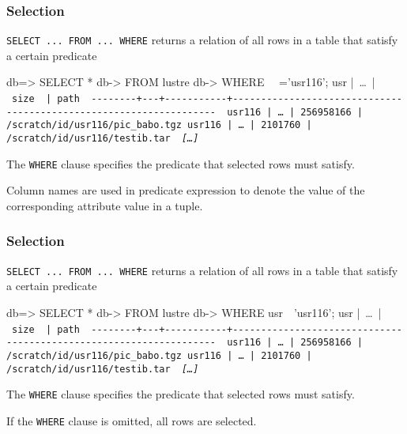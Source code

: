 \documentclass[english,serif,mathserif]{beamer}
\begin{document}
\begin{frame}[fragile]
  \frametitle{Selection}

  \texttt{SELECT ... FROM ... WHERE} returns a relation of all rows in a table
  that satisfy a certain predicate

  \+
\begin{sql}[basicstyle=\ttfamily\tiny]
db=> SELECT *
db-> FROM lustre
db-> WHERE ~~='usr116';
  usr   |~\ldots~|   ~\tt size~    | path
~-{}-{}-{}-{}-{}-{}-{}-{}+{}-{}-{}-{}+{}-{}-{}-{}-{}-{}-{}-{}-{}-{}-{}-{}+{}-{}-{}-{}-{}-{}-{}-{}-{}-{}-{}-{}-{}-{}-{}-{}-{}-{}-{}-{}-{}-{}-{}-{}-{}-{}-{}-{}-{}-{}-{}-{}-{}-{}-{}-{}-{}-{}-{}-{}-{}-{}-{}-{}-{}-{}-{}-{}-{}-{}-{}-{}-{}-{}-{}-{}-{}-{}-{}-{}-{}-{}-{}-{}-{}-{}-{}-{}~
 usr116 |~\ldots~| 256958166 | /scratch/id/usr116/pic_babo.tgz
 usr116 |~\ldots~|   2101760 | /scratch/id/usr116/testib.tar
 ~{\em [\ldots]}~
\end{sql}

The \texttt{WHERE} clause specifies the predicate that selected rows must
satisfy.

\+ Column names are used in predicate expression to denote the value of the
corresponding attribute value in a tuple.
\end{frame}


\begin{frame}[fragile]
  \frametitle{Selection}

  \texttt{SELECT ... FROM ... WHERE} returns a relation of all rows in a table
  that satisfy a certain predicate

  \+
\begin{sql}[basicstyle=\ttfamily\tiny]
db=> SELECT *
db-> FROM lustre
db-> WHERE usr~\HL{=}~'usr116';
  usr   |~\ldots~|   ~\tt size~    | path
~-{}-{}-{}-{}-{}-{}-{}-{}+{}-{}-{}-{}+{}-{}-{}-{}-{}-{}-{}-{}-{}-{}-{}-{}+{}-{}-{}-{}-{}-{}-{}-{}-{}-{}-{}-{}-{}-{}-{}-{}-{}-{}-{}-{}-{}-{}-{}-{}-{}-{}-{}-{}-{}-{}-{}-{}-{}-{}-{}-{}-{}-{}-{}-{}-{}-{}-{}-{}-{}-{}-{}-{}-{}-{}-{}-{}-{}-{}-{}-{}-{}-{}-{}-{}-{}-{}-{}-{}-{}-{}-{}-{}~
 usr116 |~\ldots~| 256958166 | /scratch/id/usr116/pic_babo.tgz
 usr116 |~\ldots~|   2101760 | /scratch/id/usr116/testib.tar
 ~{\em [\ldots]}~
\end{sql}

The \texttt{WHERE} clause specifies the predicate that selected rows must
satisfy.

\+
If the \texttt{WHERE} clause is omitted, all rows are selected.
\end{frame}
\end{document}
